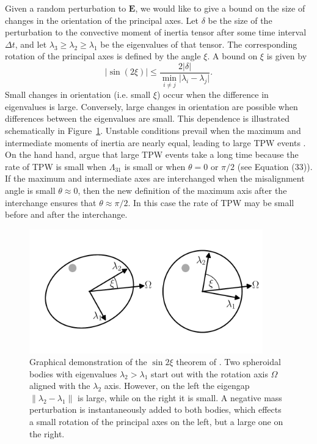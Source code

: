 \documentclass[preprint,12pt,authoryear]{elsarticle}
\begin{document}
Given a random perturbation to $\mathbf{E}$, we would like to give a bound on the size of changes in the orientation of the principal axes. Let $\delta$ be the size of the perturbation to the convective moment of inertia tensor after some time interval $\Delta t$, and let $\lambda_3 \ge \lambda_2 \ge \lambda_1$ be the eigenvalues of that tensor.  The corresponding rotation of the principal axes is defined by the angle $\xi$. A bound on $\xi$ is given by \citep{davis1970rotation}
\begin{equation}
\vert \sin(2 \xi) \vert \le \frac{ 2 \vert \delta \vert}{ \displaystyle \min_{i \neq j} \vert \lambda_i - \lambda_j \vert }.
\label{eq:kahan}
\end{equation} 
Small changes in orientation (i.e. small $\xi$) occur when the difference in eigenvalues is large. Conversely, large changes in orientation are possible when differences between the eigenvalues are small. 
This dependence is illustrated schematically in Figure~\ref{fig:perturb}.  Unstable conditions prevail when the maximum and intermediate moments of inertia are nearly equal, leading to large TPW events \citep{evans1998true}. On the hand hand, \citet{tsai2007theoretical} argue that large TPW events take a long time because the rate of TPW is small when $\Lambda_{31}$ is small or when $\theta = 0$ or $\pi/2$ (see Equation (33)). If the maximum and intermediate axes are interchanged when the misalignment angle is small $\theta \approx 0$, then the new definition of the maximum axis after the interchange ensures that $\theta \approx \pi/2$. In this case the rate of TPW may be small before and after the interchange. 



\begin{figure}
\centering
\includegraphics[width=0.9\textwidth]{figures/perturb.pdf}
\caption{Graphical demonstration of the $\sin{2 \xi}$ theorem of \citet{davis1970rotation}.  Two spheroidal bodies with eigenvalues $\lambda_2 > \lambda_1$ start out with the rotation axis $\Omega$ aligned with the $\lambda_2$ axis. However, on the left the eigengap $\lVert \lambda_2 - \lambda_1 \rVert$ is large, while on the right it is small.  A negative mass perturbation is instantaneously added to both bodies, which effects a small rotation of the principal axes on the left, but a large one on the right.}
\label{fig:perturb}
\end{figure}
\end{document}

